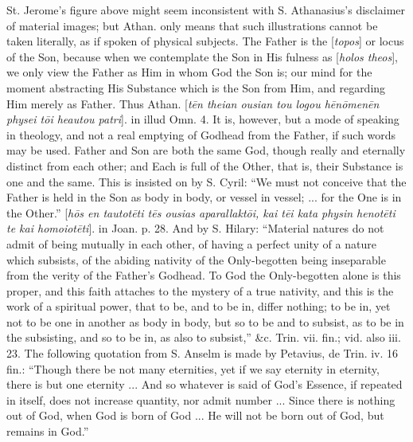 St. Jerome's figure above might seem inconsistent
with S. Athanasius's disclaimer of material images; but Athan. only
means that such illustrations cannot be taken literally, as if spoken
of physical subjects. The Father is the [\emph{topos}] or locus of the
Son, because when we contemplate the Son in His fulness as [\emph{holos
theos}], we only view the Father as Him in whom God the Son is; our
mind for the moment abstracting His Substance which is the Son from
Him, and regarding Him merely as Father. Thus Athan. [\emph{t\={e}n
theian ousian tou logou h\={e}n\={o}men\={e}n physei t\={o}i
heautou patri}]. in
illud Omn. 4. It is, however, but a mode of speaking in theology, and
not a real emptying of Godhead from the Father, if such words may
be used. Father and Son are both the same God, though really and
eternally distinct from each other; and Each is full of the Other,
that is, their Substance is one and the same. This is insisted on by
S. Cyril: ``We must not conceive that the Father is held in the Son as
body in body, or vessel in vessel; ... for the One is in the Other.'' [\emph{h\={o}s
en tautot\={e}ti t\={e}s ousias aparallakt\={o}i, kai t\={e}i
kata physin henot\={e}ti te kai homoiot\={e}ti}]. in Joan. p.
28. And by S. Hilary: ``Material natures do not admit of being mutually
in each other, of having a perfect unity of a nature which subsists,
of the abiding nativity of the Only-begotten being inseparable from
the verity of the Father's Godhead. To God the Only-begotten alone is
this proper, and this faith attaches to the mystery of a true
nativity, and this is the work of a spiritual power, that to be, and
to be in, differ nothing; to be in, yet not to be one in another as
body in body, but so to be and to subsist, as to be in the subsisting,
and so to be in, as also to subsist,'' \&c. Trin. vii. fin.; vid.
also iii. 23. The following quotation from S. Anselm is made by
Petavius, de Trin. iv. 16 fin.: ``Though there be not many eternities,
yet if we say eternity in eternity, there is but one eternity ... And
so whatever is said of God's Essence, if repeated in itself, does not
increase quantity, nor admit number ... Since there is nothing out of
God, when God is born of God ... He will not be born out of God, but
remains in God.''

